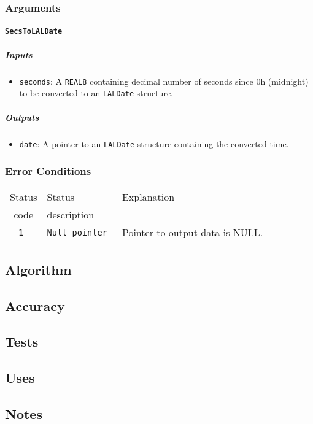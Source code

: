 \subsubsection{Arguments}

\paragraph{\texttt{SecsToLALDate}}

\subparagraph{Inputs}

\begin{itemize}
    \item \texttt{seconds}: A \texttt{REAL8} containing decimal number of
    seconds since 0h (midnight) to be converted to an \texttt{LALDate}
    structure.
\end{itemize}

\subparagraph{Outputs}

\begin{itemize}
    \item \texttt{date}: A pointer to an \texttt{LALDate} structure
    containing the converted time.
\end{itemize}

\subsubsection{Error Conditions}
\begin{tabular}{|c|l|l|}
  \hline
  Status & Status       & Explanation \\
  code   & description  &             \\
  \hline
  \tt 1  & \tt Null pointer & Pointer to output data is NULL. \\
  \hline
\end{tabular}

\subsection{Algorithm}

\subsection{Accuracy}

\subsection{Tests}

\subsection{Uses}

\subsection{Notes}


